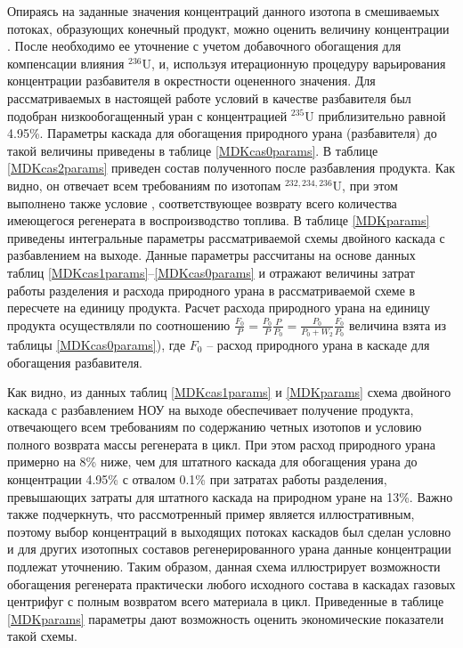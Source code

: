 Опираясь на заданные значения концентраций данного изотопа в смешиваемых потоках, образующих конечный продукт, можно оценить величину концентрации . После необходимо ее уточнение с учетом добавочного обогащения для компенсации влияния $^{236}$U, и, используя итерационную процедуру варьирования концентрации разбавителя в окрестности оцененного значения. Для рассматриваемых в настоящей работе условий в качестве разбавителя был подобран низкообогащенный уран с концентрацией $^{235}$U  приблизительно равной 4.95\%. Параметры каскада для обогащения природного урана (разбавителя) до такой величины приведены в таблице \ref{MDKcas0params}. В таблице \ref{MDKcas2params} приведен состав полученного после разбавления продукта. Как видно, он отвечает всем требованиям по изотопам $^{232,234,236}$U, при этом выполнено также условие , соответствующее возврату всего количества имеющегося регенерата в воспроизводство топлива. В таблице \ref{MDKparams} приведены интегральные параметры рассматриваемой схемы двойного каскада с разбавлением на выходе. Данные параметры рассчитаны на основе данных таблиц \ref{MDKcas1params}--\ref{MDKcas0params} и отражают величины затрат работы разделения и расхода природного урана в рассматриваемой схеме в пересчете на единицу продукта. Расчет расхода природного урана на единицу продукта осуществляли по соотношению $\frac{F_{0}}{P}=\frac{P_{0}}{P} \frac{P}{P_{0}}=\frac{P_{0}}{P_{0}+W_{2}} \frac{F_{0}}{P_{0}}$ величина взята из таблицы \ref{MDKcas0params}), где $F_{0}$ -- расход природного урана в каскаде для обогащения разбавителя.

Как видно, из данных таблиц \ref{MDKcas1params} и \ref{MDKparams} схема двойного каскада с разбавлением НОУ на выходе обеспечивает получение продукта, отвечающего всем требованиям по содержанию четных изотопов и условию полного возврата массы регенерата в цикл. При этом расход природного урана примерно на 8\% ниже, чем для штатного каскада для обогащения урана до концентрации 4.95\% с отвалом 0.1\% при затратах работы разделения, превышающих затраты для штатного каскада на природном уране на 13\%. Важно также подчеркнуть, что рассмотренный пример является иллюстративным, поэтому выбор концентраций в выходящих потоках каскадов был сделан условно и для других изотопных составов регенерированного урана данные концентрации подлежат уточнению. Таким образом, данная схема иллюстрирует возможности обогащения регенерата практически любого исходного состава в каскадах газовых центрифуг с полным возвратом всего материала в цикл. Приведенные в таблице \ref{MDKparams} параметры дают возможность оценить экономические показатели такой схемы.

